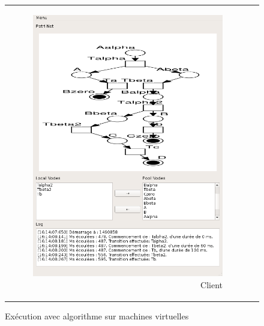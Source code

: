 \begin{figure}
\begin{tabular}{rl}
\begin{subfigure}{0.5\textwidth}
				\includegraphics[scale=0.45]{images/resultats/vm/clientVMalgo.png}
				\caption{Client}
			\end{subfigure}
		\end{tabular}
		
		\caption{Exécution avec algorithme sur machines virtuelles}
		\label{fig.algoVM}
	\end{figure}
	
